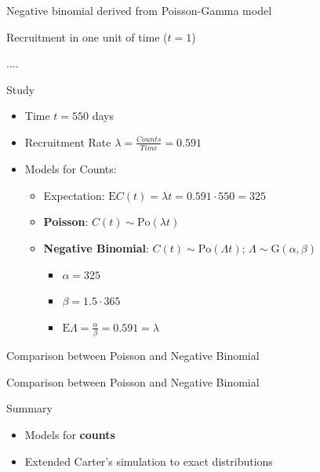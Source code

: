 \documentclass[english]{beamer}\usepackage[]{graphicx}\usepackage[]{xcolor}
\begin{document}
\begin{frame}{Negative binomial derived from Poisson-Gamma model}

Recruitment in one unit of time ($t=1$)

....

\end{frame}


\begin{frame}{Study}
\begin{itemize}
\item Time $t = 550$ days
\item Recruitment Rate $\lambda = \frac{Counts}{Time} = 0.591$
\item Models for Counts:
	\begin{itemize}
	\item Expectation: $\textrm{E}C(t) = \lambda t = 0.591 \cdot 550 = 325$
	\item \textbf{Poisson}: $C(t) \sim \textrm{Po}(\lambda t)$
	\item \textbf{Negative Binomial}: $C(t) \sim \textrm{Po} (\Lambda t)$; $\Lambda \sim \textrm{G}(\alpha,\beta)$
		\begin{itemize}
		\item $\alpha = 325$
		\item $\beta = 1.5\cdot 365$
		\item $\textrm{E} \Lambda = \frac{\alpha}{\beta} = 0.591 = \lambda$
		\end{itemize}
	\end{itemize}
\end{itemize}
\end{frame}

\begin{frame}{Comparison between Poisson and Negative Binomial}

\end{frame}

\begin{frame}{Comparison between Poisson and Negative Binomial}


\end{frame}


% 
% 
% 
% 
% 
% 



\begin{frame}{Summary}
\begin{itemize}
\item Models for \textbf{counts}
\item Extended Carter's simulation to exact distributions
\end{itemize}

\end{frame}
\end{document}
